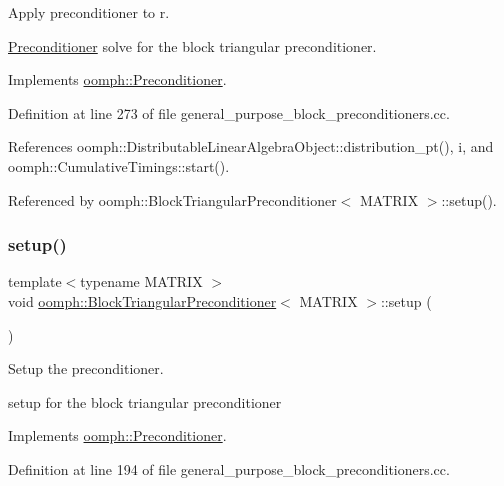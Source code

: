 Apply preconditioner to r. 

\hyperlink{classoomph_1_1Preconditioner}{Preconditioner} solve for the block triangular preconditioner. 

Implements \hyperlink{classoomph_1_1Preconditioner_ace1199369e4465cd2b9a34884bb64ec8}{oomph\+::\+Preconditioner}.



Definition at line 273 of file general\+\_\+purpose\+\_\+block\+\_\+preconditioners.\+cc.



References oomph\+::\+Distributable\+Linear\+Algebra\+Object\+::distribution\+\_\+pt(), i, and oomph\+::\+Cumulative\+Timings\+::start().



Referenced by oomph\+::\+Block\+Triangular\+Preconditioner$<$ M\+A\+T\+R\+I\+X $>$\+::setup().

\mbox{\label{classoomph_1_1BlockTriangularPreconditioner_a2d08f17f9ba08a5772cb32fabcd4f984}} 
\subsubsection{\texorpdfstring{setup()}{setup()}}
{\footnotesize\ttfamily template$<$typename M\+A\+T\+R\+IX $>$ \\
void \hyperlink{classoomph_1_1BlockTriangularPreconditioner}{oomph\+::\+Block\+Triangular\+Preconditioner}$<$ M\+A\+T\+R\+IX $>$\+::setup (\begin{DoxyParamCaption}{ }\end{DoxyParamCaption})\hspace{0.3cm}{\ttfamily [virtual]}}



Setup the preconditioner. 

setup for the block triangular preconditioner 

Implements \hyperlink{classoomph_1_1Preconditioner_af4886f4efe510e5c9b0eb19422943588}{oomph\+::\+Preconditioner}.



Definition at line 194 of file general\+\_\+purpose\+\_\+block\+\_\+preconditioners.\+cc.




